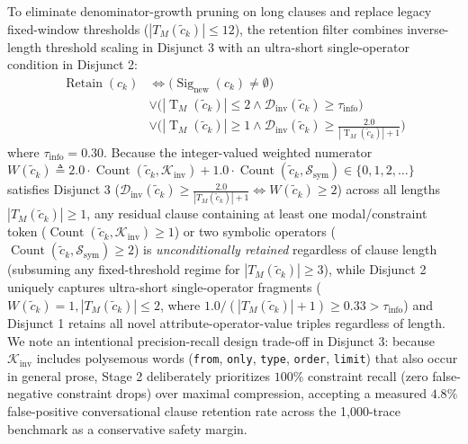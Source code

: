 \documentclass[conference,10pt]{IEEEtran}
\begin{document}
To eliminate denominator-growth pruning on long clauses and replace legacy fixed-window thresholds ($|T_M(\tilde{c}_k)| \le 12$), the retention filter combines inverse-length threshold scaling in Disjunct 3 with an ultra-short single-operator condition in Disjunct 2:
\begin{align}
\label{eq:retention_filter}
\operatorname{Retain}(c_k) &\iff \Big( \operatorname{Sig}_{\text{new}}(c_k) \neq \emptyset \Big) \nonumber \\
&\lor \Big( |\operatorname{T}_M(\tilde{c}_k)| \le 2 \land \mathcal{D}_{\text{inv}}(\tilde{c}_k) \ge \tau_{\text{info}} \Big) \nonumber \\
&\lor \Big( |\operatorname{T}_M(\tilde{c}_k)| \ge 1 \land \mathcal{D}_{\text{inv}}(\tilde{c}_k) \ge \frac{2.0}{|\operatorname{T}_M(\tilde{c}_k)| + 1} \Big)
\end{align}
where $\tau_{\text{info}} = 0.30$. Because the integer-valued weighted numerator $W(\tilde{c}_k) \triangleq 2.0 \cdot \operatorname{Count}(\tilde{c}_k, \mathcal{K}_{\text{inv}}) + 1.0 \cdot \operatorname{Count}(\tilde{c}_k, \mathcal{S}_{\text{sym}}) \in \{0, 1, 2, \dots\}$ satisfies Disjunct 3 ($\mathcal{D}_{\text{inv}}(\tilde{c}_k) \ge \frac{2.0}{|T_M(\tilde{c}_k)| + 1} \iff W(\tilde{c}_k) \ge 2$) across all lengths $|T_M(\tilde{c}_k)| \ge 1$, any residual clause containing at least one modal/constraint token ($\operatorname{Count}(\tilde{c}_k, \mathcal{K}_{\text{inv}}) \ge 1$) or two symbolic operators ($\operatorname{Count}(\tilde{c}_k, \mathcal{S}_{\text{sym}}) \ge 2$) is \textit{unconditionally retained} regardless of clause length (subsuming any fixed-threshold regime for $|T_M(\tilde{c}_k)| \ge 3$), while Disjunct 2 uniquely captures ultra-short single-operator fragments ($W(\tilde{c}_k) = 1, |T_M(\tilde{c}_k)| \le 2$, where $1.0/(|T_M(\tilde{c}_k)|+1) \ge 0.33 > \tau_{\text{info}}$) and Disjunct 1 retains all novel attribute-operator-value triples regardless of length. We note an intentional precision-recall design trade-off in Disjunct 3: because $\mathcal{K}_{\text{inv}}$ includes polysemous words (\texttt{from}, \texttt{only}, \texttt{type}, \texttt{order}, \texttt{limit}) that also occur in general prose, Stage 2 deliberately prioritizes $100\%$ constraint recall (zero false-negative constraint drops) over maximal compression, accepting a measured $4.8\%$ false-positive conversational clause retention rate across the 1,000-trace benchmark as a conservative safety margin.
\end{document}
